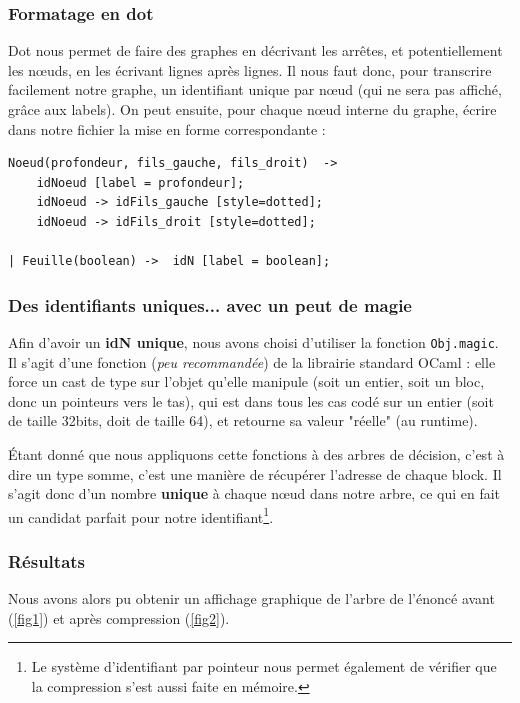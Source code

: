\documentclass[12pt,a4paper]{article}
\begin{document}
\subsubsection{Formatage en dot}

Dot nous permet de faire des graphes en décrivant les arrêtes, et potentiellement les nœuds, en les écrivant lignes après lignes. Il nous faut donc, pour transcrire facilement notre graphe, un identifiant unique par nœud (qui ne sera pas affiché, grâce aux labels). On peut ensuite, pour chaque nœud interne du graphe, écrire dans notre fichier la mise en forme correspondante : 


\begin{lstlisting}
Noeud(profondeur, fils_gauche, fils_droit)  -> 
	idNoeud [label = profondeur];
	idNoeud -> idFils_gauche [style=dotted]; 
 	idNoeud -> idFils_droit [style=dotted];

| Feuille(boolean) ->  idN [label = boolean];
\end{lstlisting}

\subsubsection{Des identifiants uniques... avec un peut de magie}
Afin d'avoir un \textbf{idN unique}, nous avons choisi d'utiliser la fonction \texttt{Obj.magic}. Il s'agit d'une fonction (\textit{peu recommandée}) de la librairie standard OCaml : elle force un cast de type sur l'objet qu'elle manipule (soit un entier, soit un bloc, donc un pointeurs vers le tas), qui est dans tous les cas codé sur un entier (soit de taille 32bits, doit de taille 64), et retourne sa valeur "réelle" (au runtime). 

Étant donné que nous appliquons cette fonctions à des arbres de décision, c'est à dire un type somme, c'est une manière de récupérer l'adresse de chaque block. Il s'agit donc d'un nombre \textbf{unique} à chaque nœud dans notre arbre, ce qui en fait un candidat parfait pour notre identifiant\footnote{Le système d'identifiant par pointeur nous permet également de vérifier que la compression s'est aussi faite en mémoire.}.


\subsubsection{Résultats}

Nous avons alors pu obtenir un affichage graphique de l'arbre de l'énoncé avant (\ref{fig1}) et après compression (\ref{fig2}). 
\end{document}
